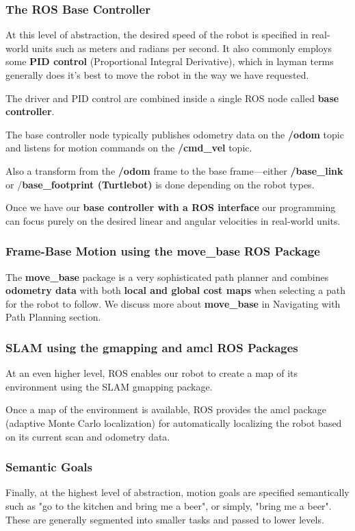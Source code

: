 \documentclass[10pt,a4paper]{article}
\begin{document}
\subsubsection{The ROS Base Controller}
At this level of abstraction, the desired speed of the robot is specified in real-world units such as meters and radians per second. It also commonly employs some \textbf{PID control }(Proportional Integral Derivative), which in layman terms generally does it's best to move the robot in the way we have requested. 

The driver and PID control are combined inside a single ROS node called \textbf{base controller}. 

The base controller node typically publishes odometry data on the \textbf{/odom }topic and listens for motion commands on the \textbf{/cmd\_vel} topic.

Also a transform from the \textbf{/odom} frame to the base frame—either \textbf{/base\_link} or /\textbf{base\_footprint (Turtlebot)} is done depending on the robot types.

Once we have our \textbf{base controller with a ROS interface} our programming can focus purely on the desired linear and angular velocities in real-world units.

\subsubsection{Frame-Base Motion using the move\_base ROS Package}
The \textbf{move\_base} package is a very sophisticated path planner and combines \textbf{odometry data} with both \textbf{local and global cost maps }when selecting a path for the robot to follow. We discuss more about \textbf{move\_base} in Navigating with Path Planning section.

\subsubsection{SLAM using the gmapping and amcl ROS Packages}
At an even higher level, ROS enables our robot to create a map of its environment using the SLAM gmapping package.

Once a map of the environment is available, ROS provides the amcl package (adaptive Monte Carlo localization) for automatically localizing the robot based on its current scan and odometry data.

\subsubsection{Semantic Goals}
Finally, at the highest level of abstraction, motion goals are specified semantically such as "go to the kitchen and bring me a beer", or simply, "bring me a beer". These are generally segmented into smaller tasks and passed to lower levels.
\end{document}
